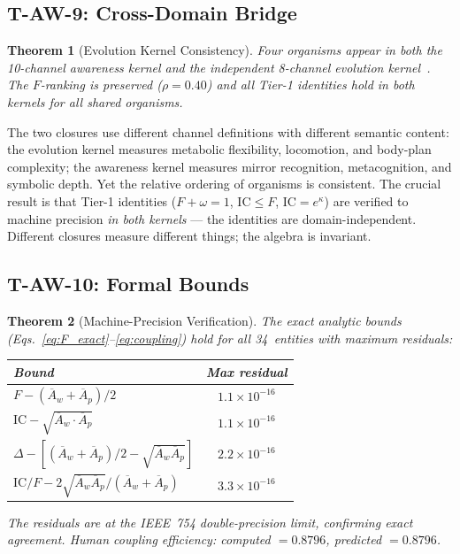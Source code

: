 \documentclass[
  aps,
  prd,
  twocolumn,
  superscriptaddress,
  nofootinbib,
  floatfix
]{revtex4-2}
\newtheorem{theorem}{Theorem}
\newcommand{\IC}{\mathrm{IC}}
\newcommand{\Aw}{\overline{A}_{\!w}}
\newcommand{\Ap}{\overline{A}_{\!p}}
\begin{document}
\subsection{T-AW-9: Cross-Domain Bridge}

\begin{theorem}[Evolution Kernel Consistency]\label{thm:TAW9}
Four organisms appear in both the 10-channel awareness kernel
and the independent 8-channel evolution
kernel~\cite{paulus2025umcp}.  The $F$-ranking is preserved
($\rho = 0.40$) and all Tier-1 identities hold in both
kernels for all shared organisms.
\end{theorem}

The two closures use different channel definitions with
different semantic content: the evolution kernel measures
metabolic flexibility, locomotion, and body-plan complexity;
the awareness kernel measures mirror recognition, metacognition,
and symbolic depth.  Yet the relative ordering of organisms
is consistent.  The crucial result is that Tier-1 identities
($F + \omega = 1$, $\IC \leq F$, $\IC = e^\kappa$) are
verified to machine precision \emph{in both kernels} --- the
identities are domain-independent.  Different closures measure
different things; the algebra is invariant.

\subsection{T-AW-10: Formal Bounds}

\begin{theorem}[Machine-Precision Verification]%
\label{thm:TAW10}
The exact analytic bounds
(Eqs.~\ref{eq:F_exact}--\ref{eq:coupling}) hold for all
34~entities with maximum residuals:
\begin{center}
\begin{tabular}{lc}
\toprule
Bound & Max residual \\
\midrule
$F - (\Aw + \Ap)/2$ & $1.1 \times 10^{-16}$ \\
$\IC - \sqrt{\Aw \cdot \Ap}$ & $1.1 \times 10^{-16}$ \\
$\Delta - [(\Aw+\Ap)/2 - \sqrt{\Aw\Ap}]$
  & $2.2 \times 10^{-16}$ \\
$\IC/F - 2\sqrt{\Aw\Ap}/(\Aw+\Ap)$
  & $3.3 \times 10^{-16}$ \\
\bottomrule
\end{tabular}
\end{center}
The residuals are at the IEEE~754 double-precision limit,
confirming exact agreement.  Human coupling efficiency:
computed $= 0.8796$, predicted $= 0.8796$.
\end{theorem}
\end{document}
